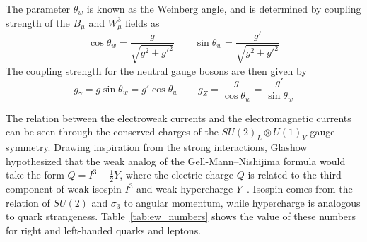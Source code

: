 The parameter $\theta_w$ is known as the Weinberg angle, and is determined by coupling strength of the $B_\mu$ and $W_\mu^3$ fields as
\begin{equation}
	\cos\theta_w=\frac{g}{\sqrt{g^2+g'^2}} \qquad \sin\theta_w=\frac{g'}{\sqrt{g^2+g'^2}}
\end{equation}
The coupling strength for the neutral gauge bosons are then given by
\begin{equation}
	g_\gamma=g\sin\theta_w=g'\cos\theta_w \qquad g_Z=\frac{g}{\cos\theta_w}=\frac{g'}{\sin\theta_w}
\end{equation}

The relation between the electroweak currents and the electromagnetic currents can be seen through the conserved charges of the $SU(2)_L\otimes U(1)_Y$ gauge symmetry. Drawing inspiration from the strong interactions, Glashow hypothesized that the weak analog of the Gell-Mann--Nishijima formula would take the form $Q=I^3+\frac{1}{2}Y$, where the electric charge $Q$ is related to the third component of weak isospin $I^3$ and weak hypercharge $Y$~\cite{weakisospin}. Isospin comes from the relation of $SU(2)$ and $\sigma_3$ to angular momentum, while hypercharge is analogous to quark strangeness. Table~\ref{tab:ew_numbers} shows the value of these numbers for right and left-handed quarks and leptons.

